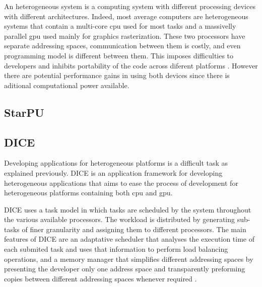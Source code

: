 An heterogeneous system is a computing system with different processing devices with different architectures. Indeed, most average computers are heterogeneous systems that contain a multi-core \gls{cpu} used for most tasks and a massivelly parallel \gls{gpu} used mainly for graphics rasterization. These two processors have separate addressing spaces, communication between them is costly, and even programming model is different between them. This imposes difficulties to developers and inhibits portability of the code across diferent platforms \citep{Kunzman}. However there are potential performance gains in using both devices since there is aditional computational power available. 

\subsection{StarPU}


\subsection{DICE}

Developing applications for heterogeneous platforms is a difficult task as explained previously. DICE is an application framework for developing heterogeneous applications that aims to ease the process of development for heterogeneous platforms containing both \gls{cpu} and \gls{gpu}.

DICE uses a task model in which tasks are scheduled by the system throughout the various available processors. The workload is distributed by generating sub-tasks of finer granularity and assigning them to different processors. The main features of DICE are an adaptative scheduler that analyses the execution time of each submited task and uses that information to perform load balancing operations, and a memory manager that simplifies different addressing spaces by presenting the developer only one address space and transparently preforming copies between different addressing spaces whenever required \citep{Barbosa}.

